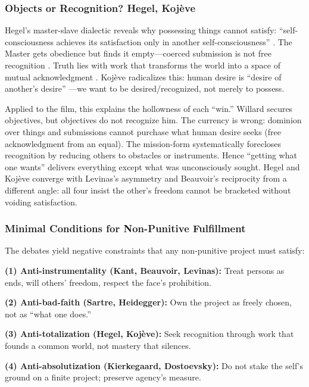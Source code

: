 \subsubsection*{Objects or Recognition? Hegel, Kojève}

Hegel's master-slave dialectic reveals why possessing things cannot satisfy: 
``self-consciousness achieves its satisfaction only in another self-consciousness'' 
\parencite[\S 175]{HegelPhenomenology1977}. The Master gets obedience but finds it empty---coerced 
submission is not free recognition \parencite[\S\S 187--189]{HegelPhenomenology1977}. Truth 
lies with work that transforms the world into a space of mutual acknowledgment 
\parencite[\S 196]{HegelPhenomenology1977}. Koj{\`e}ve radicalizes this: human desire is 
``desire of another's desire'' \parencite[p.~6]{KojeveIRH1980}---we want to be desired/recognized, 
not merely to possess.

Applied to the film, this explains the hollowness of each ``win.'' Willard secures objectives, 
but objectives do not recognize him. The currency is wrong: dominion over things and 
submissions cannot purchase what human desire seeks (free acknowledgment from an equal). The 
mission-form systematically forecloses recognition by reducing others to obstacles or 
instruments. Hence ``getting what one wants'' delivers everything except what was unconsciously 
sought. Hegel and Koj{\`e}ve converge with Levinas's asymmetry and Beauvoir's reciprocity from 
a different angle: all four insist the other's freedom cannot be bracketed without voiding 
satisfaction.

\subsubsection*{Minimal Conditions for Non-Punitive Fulfillment}

The debates yield negative constraints that any non-punitive project must satisfy:

\textbf{(1) Anti-instrumentality (Kant, Beauvoir, Levinas):} Treat persons as ends, will 
others' freedom, respect the face's prohibition.

\textbf{(2) Anti-bad-faith (Sartre, Heidegger):} Own the project as freely chosen, not as 
``what one does.''

\textbf{(3) Anti-totalization (Hegel, Kojève):} Seek recognition through work that founds a 
common world, not mastery that silences.

\textbf{(4) Anti-absolutization (Kierkegaard, Dostoevsky):} Do not stake the self's ground on 
a finite project; preserve agency's measure.

